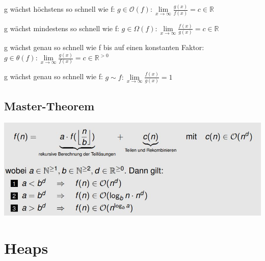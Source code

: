 \documentclass[12pt]{article}
\begin{document}
g wächst höchstens so schnell wie f: \newline
 $ g \in \mathcal{O}(f): \lim \limits_{x \to \infty} \frac{g(x)}{f(x)} = c \in \mathbb{R} $ \hfill \break

g wächst mindestens so schnell wie f:\newline
 $ g \in\Omega(f): \lim \limits_{x \to \infty} \frac{f(x)}{g(x)} = c \in \mathbb{R} $ \hfill \break
 

g wächst genau so schnell wie f bis auf einen konstanten Faktor:\newline
$ g \in \theta (f): \lim \limits_{x \to \infty} \frac{g(x)}{f(x)} = c \in \mathbb{R}^{>0} $ \hfill \break



g wächst genau so schnell wie f: \newline
$ g \sim f: \lim \limits_{x \to \infty} \frac{f(x)}{g(x)} = 1 $ \hfill \break

\subsection{Master-Theorem}

\includegraphics{Master}

\section{Heaps}


\end{document}
